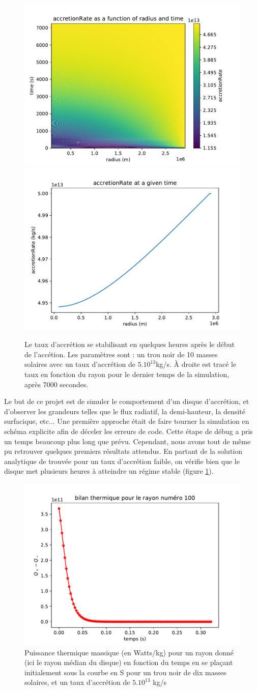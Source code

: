 \documentclass[a4paper,12pt]{article}
\begin{document}
\begin{figure}
  \centering
  \includegraphics[width=0.4\linewidth]{accretionRate-stable.pdf}
  \includegraphics[width=0.4\linewidth]{last-accretionRate.pdf}
  \caption{Le taux d'accrétion se stabilisant en quelques heures après le début de l'accétion. Les paramètres sont : un trou noir de 10 masses solaires avec un taux d'accrétion de $5.10^{13}$kg/s. À droite est tracé le taux en fonction du rayon pour le dernier temps de la simulation, après 7000 secondes.}
  \label{accretion rate stabilisation}
\end{figure}



Le but de ce projet est de simuler le comportement d'un disque d'accrétion, et d'observer les grandeurs telles que le flux radiatif, la demi-hauteur, la densité surfacique, etc... Une première approche était de faire tourner la simulation en schéma explicite afin de déceler les erreurs de code. Cette étape de débug a pris un temps beaucoup plus long que prévu. Cependant, nous avons tout de même pu retrouver quelques premiers résultats attendus. En partant de la solution analytique  de \cite{king} trouvée pour un taux d'accrétion faible, on vérifie bien que le disque met plusieurs heures à atteindre un régime stable (figure \ref{accretion rate stabilisation}).

\begin{figure}
  \centering
  \includegraphics[width=0.6\linewidth]{deltaQ-199.pdf}
  \caption{Puissance thermique massique (en Watts/kg) pour un rayon donné (ici le rayon médian du disque) en fonction du temps en se plaçant initialement sous la courbe en S pour un trou noir de dix masses solaires, et un taux d'accrétion de $5.10^{13}$ kg/s}
\end{figure}
\end{document}
